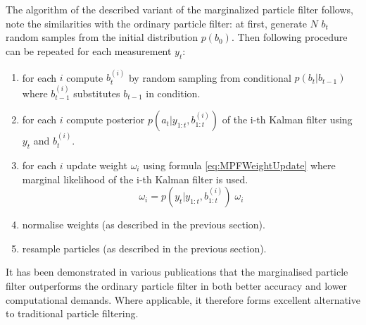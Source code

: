 The algorithm of the described variant of the marginalized particle filter follows, note the
similarities with the ordinary particle filter: at first, generate \(N\) \(b_t\) random samples from
the initial distribution \(p(b_0)\). Then following procedure can be repeated for each measurement
\(y_t\):
\begin{enumerate}
	\item for each \(i\) compute \(b_t^{(i)}\) by random sampling from conditional {\pdf}
		\(p(b_t|b_{t-1})\) where \(b_{t-1}^{(i)}\) substitutes \(b_{t-1}\) in condition.
	\item for each \(i\) compute posterior {\pdf} \(p(a_t|y_{1:t},b_{1:t}^{(i)})\) of the i-th
		Kalman filter using \(y_t\) and \(b_t^{(i)}\).
	\item for each \(i\) update weight \(\omega_i\) using formula \eqref{eq:MPFWeightUpdate} where
		marginal likelihood of the i-th Kalman filter is used.
		\begin{equation} \label{eq:MPFWeightUpdate}
			\omega_i = p(y_t|y_{1:t},b_{1:t}^{(i)}) \; \omega_i
		\end{equation}
	\item normalise weights (as described in the previous section).
	\item resample particles (as described in the previous section).
\end{enumerate}

It has been demonstrated in various publications that the marginalised particle filter outperforms
the ordinary particle filter in both better accuracy and lower computational demands. Where
applicable, it therefore forms excellent alternative to traditional particle filtering.
